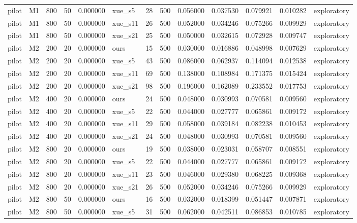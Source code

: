 \begin{longtable}{llrrrlrrrrrrl}
pilot & M1 & 800 & 50 & 0.000000 & xue\_s5 & 28 & 500 & 0.056000 & 0.037530 & 0.079921 & 0.010282 & exploratory \\
pilot & M1 & 800 & 50 & 0.000000 & xue\_s11 & 26 & 500 & 0.052000 & 0.034246 & 0.075266 & 0.009929 & exploratory \\
pilot & M1 & 800 & 50 & 0.000000 & xue\_s21 & 25 & 500 & 0.050000 & 0.032615 & 0.072928 & 0.009747 & exploratory \\
pilot & M2 & 200 & 20 & 0.000000 & ours & 15 & 500 & 0.030000 & 0.016886 & 0.048998 & 0.007629 & exploratory \\
pilot & M2 & 200 & 20 & 0.000000 & xue\_s5 & 43 & 500 & 0.086000 & 0.062937 & 0.114094 & 0.012538 & exploratory \\
pilot & M2 & 200 & 20 & 0.000000 & xue\_s11 & 69 & 500 & 0.138000 & 0.108984 & 0.171375 & 0.015424 & exploratory \\
pilot & M2 & 200 & 20 & 0.000000 & xue\_s21 & 98 & 500 & 0.196000 & 0.162089 & 0.233552 & 0.017753 & exploratory \\
pilot & M2 & 400 & 20 & 0.000000 & ours & 24 & 500 & 0.048000 & 0.030993 & 0.070581 & 0.009560 & exploratory \\
pilot & M2 & 400 & 20 & 0.000000 & xue\_s5 & 22 & 500 & 0.044000 & 0.027777 & 0.065861 & 0.009172 & exploratory \\
pilot & M2 & 400 & 20 & 0.000000 & xue\_s11 & 29 & 500 & 0.058000 & 0.039184 & 0.082238 & 0.010453 & exploratory \\
pilot & M2 & 400 & 20 & 0.000000 & xue\_s21 & 24 & 500 & 0.048000 & 0.030993 & 0.070581 & 0.009560 & exploratory \\
pilot & M2 & 800 & 20 & 0.000000 & ours & 19 & 500 & 0.038000 & 0.023031 & 0.058707 & 0.008551 & exploratory \\
pilot & M2 & 800 & 20 & 0.000000 & xue\_s5 & 22 & 500 & 0.044000 & 0.027777 & 0.065861 & 0.009172 & exploratory \\
pilot & M2 & 800 & 20 & 0.000000 & xue\_s11 & 23 & 500 & 0.046000 & 0.029380 & 0.068225 & 0.009368 & exploratory \\
pilot & M2 & 800 & 20 & 0.000000 & xue\_s21 & 26 & 500 & 0.052000 & 0.034246 & 0.075266 & 0.009929 & exploratory \\
pilot & M2 & 800 & 50 & 0.000000 & ours & 16 & 500 & 0.032000 & 0.018399 & 0.051447 & 0.007871 & exploratory \\
pilot & M2 & 800 & 50 & 0.000000 & xue\_s5 & 31 & 500 & 0.062000 & 0.042511 & 0.086853 & 0.010785 & exploratory \\

\end{longtable}
